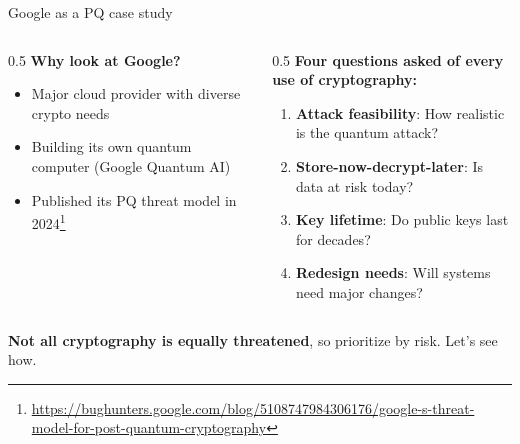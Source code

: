 \ifdefined\PRESENTATION\else\PassOptionsToClass{handout}{beamer}\fi\documentclass[aspectratio=169, lualatex]{beamer}
\begin{document}
\begin{frame}{Google as a PQ case study}
	\begin{columns}[c]
		\begin{column}{0.5\textwidth}
			\textbf{Why look at Google?}
			\begin{itemize}
				\item Major cloud provider with diverse crypto needs
				\item Building its own quantum computer (Google Quantum AI)
				\item Published its PQ threat model in 2024\footnote{\url{https://bughunters.google.com/blog/5108747984306176/google-s-threat-model-for-post-quantum-cryptography}}
			\end{itemize}
		\end{column}
		\begin{column}{0.5\textwidth}
			\textbf{Four questions asked of every use of cryptography:}
			\begin{enumerate}
				\item \textbf{Attack feasibility}: How realistic is the quantum attack?
				\item \textbf{Store-now-decrypt-later}: Is data at risk today?
				\item \textbf{Key lifetime}: Do public keys last for decades?
				\item \textbf{Redesign needs}: Will systems need major changes?
			\end{enumerate}
		\end{column}
	\end{columns}
	\vspace{4mm}
	\begin{center}
		\textbf{Not all cryptography is equally threatened}, so prioritize by risk. Let's see how.
	\end{center}
\end{frame}
\end{document}
